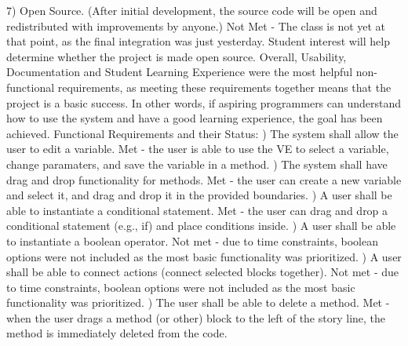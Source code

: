 \documentclass[a4paper]{article}
\begin{document}
7) Open Source.  (After initial development, the source code will be open and redistributed with improvements by anyone.) Not Met - The class is not yet at that point, as the final integration was just yesterday.  Student interest will help determine whether the project is made open source. \newline \newline 
Overall, Usability, Documentation and Student Learning Experience were the most helpful non-functional requirements, as meeting these requirements together means that the project is a basic success.  In other words, if aspiring programmers can understand how to use the system and have a good learning experience, the goal has been achieved. \newline \newline
Functional Requirements and their Status: \newline {}) The system shall allow the user to edit a variable.  Met - the user is able to use the VE to select a variable, change paramaters, and save the variable in a method. \newline {}) The system shall have drag and drop functionality for methods.  Met - the user can create a new variable and select it, and drag and drop it in the provided boundaries.  \newline {}) A user shall be able to instantiate a conditional statement.  Met - the user can drag and drop a conditional statement (e.g., if) and place conditions inside.  \newline {}) A user shall be able to instantiate a boolean operator.  Not met - due to time constraints, boolean options were not included as the most basic functionality was prioritized. \newline {}) A user shall be able to connect actions (connect selected blocks together).  Not met - due to time constraints, boolean options were not included as the most basic functionality was prioritized. \newline {}) The user shall be able to delete a method.  Met - when the user drags a method (or other) block to the left of the story line, the method is immediately deleted from the code.  \newline \newline
\end{document}
